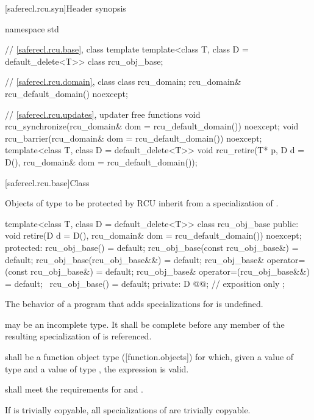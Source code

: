 [saferecl.rcu.syn]{Header  synopsis}

\begin{codeblock}
namespace std {
  // \ref{saferecl.rcu.base}, class template 
  template<class T, class D = default_delete<T>>
    class rcu_obj_base;

  // \ref{saferecl.rcu.domain}, class 
  class rcu_domain;
  rcu_domain& rcu_default_domain() noexcept;

  // \ref{saferecl.rcu.updates}, updater free functions
  void rcu_synchronize(rcu_domain& dom = rcu_default_domain()) noexcept;
  void rcu_barrier(rcu_domain& dom = rcu_default_domain()) noexcept;
  template<class T, class D = default_delete<T>>
    void rcu_retire(T* p, D d = D(), rcu_domain& dom = rcu_default_domain());
}
\end{codeblock}

[saferecl.rcu.base]{Class }

Objects of type  to be protected by RCU inherit from a
specialization of .

\begin{codeblock}
template<class T, class D = default_delete<T>>
class rcu_obj_base {
public:
  void retire(D d = D(), rcu_domain& dom = rcu_default_domain()) noexcept;
protected:
  rcu_obj_base() = default;
  rcu_obj_base(const rcu_obj_base&) = default;
  rcu_obj_base(rcu_obj_base&&) = default;
  rcu_obj_base& operator=(const rcu_obj_base&) = default;
  rcu_obj_base& operator=(rcu_obj_base&&) = default;
  ~rcu_obj_base() = default;
private:
  D @@;            // exposition only
};
\end{codeblock}

\pnum
The behavior of a program that adds specializations for
 is undefined.

\pnum
{} may be an incomplete type.
It shall be complete before any member of the resulting specialization of
 is referenced.

\pnum
{} shall be a
function object type ([function.objects]) for which,
given a value  of type  and a value 
of type , the expression  is valid.

\pnum
{} shall meet the requirements for
 and .

\pnum
If  is trivially copyable, all specializations of
 are trivially copyable.

